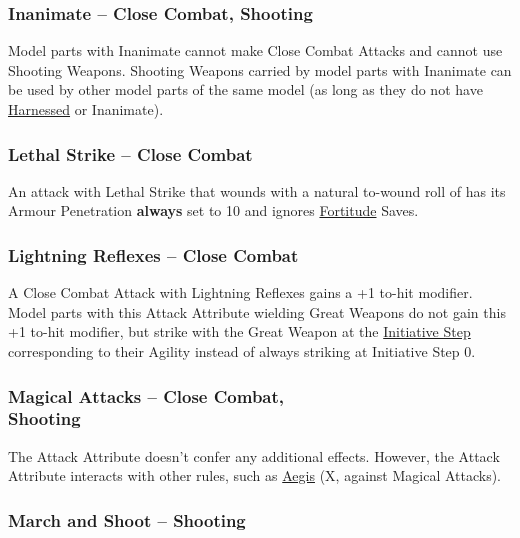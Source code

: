 \subsubsection{Inanimate -- Close Combat, Shooting}
\idx[main=y]{\inanimate}\label{inanimate}

Model parts with Inanimate cannot make Close Combat Attacks and cannot use Shooting Weapons. Shooting Weapons carried by model parts with Inanimate can be used by other model parts of the same model (as long as they do not have \hyperref[harnessed]{Harnessed} or Inanimate).

\subsubsection{Lethal Strike -- Close Combat}
\label{lethal_strike}

An attack with Lethal Strike that wounds with a natural to-wound roll of  has its Armour Penetration \textbf{always} set to 10 and ignores \hyperref[fortitude]{Fortitude} Saves.

\subsubsection{Lightning Reflexes -- Close Combat}
\idx[main=y]{\lightningreflexes}\label{lightning_reflexes}

A Close Combat Attack with Lightning Reflexes gains a +1 to-hit modifier. Model parts with this Attack Attribute wielding Great Weapons do not gain this +1 to-hit modifier, but strike with the Great Weapon at the \hyperref[initiative_order]{Initiative Step} corresponding to their Agility instead of always striking at Initiative Step 0.

\subsubsection[Magical Attacks -- Close Combat, Shooting]{Magical Attacks -- Close Combat,\\ Shooting}
\idx[main=y]{\magicalattacks}\label{magical_attacks}

The Attack Attribute doesn't confer any additional effects. However, the Attack Attribute interacts with other rules, such as \hyperref[aegis]{Aegis} (X, against Magical Attacks).

\subsubsection{March and Shoot -- Shooting}
\idx[main=y]{\marchandshoot}\label{march_and_shoot}

